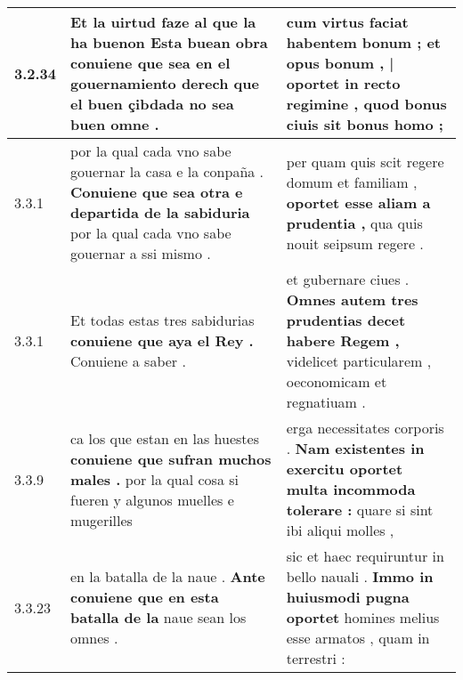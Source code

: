 \begin{tabular}{|p{1cm}|p{6.5cm}|p{6.5cm}|}
3.2.34 & Et la uirtud faze al que la ha buenon \textbf{ Esta buean obra conuiene que sea en el gouernamiento derech } que el buen çibdada no sea buen omne . & cum virtus faciat habentem bonum ; \textbf{ et opus bonum , | oportet in recto regimine , } quod bonus ciuis sit bonus homo ; \\\hline
3.3.1 & por la qual cada vno sabe gouernar la casa e la conpaña . \textbf{ Conuiene que sea otra e departida de la sabiduria } por la qual cada vno sabe gouernar a ssi mismo . & per quam quis scit regere domum et familiam , \textbf{ oportet esse aliam a prudentia , } qua quis nouit seipsum regere . \\\hline
3.3.1 & Et todas estas tres sabidurias \textbf{ conuiene que aya el Rey . } Conuiene a saber . & et gubernare ciues . \textbf{ Omnes autem tres prudentias decet habere Regem , } videlicet particularem , oeconomicam et regnatiuam . \\\hline
3.3.9 & ca los que estan en las huestes \textbf{ conuiene que sufran muchos males . } por la qual cosa si fueren y algunos muelles e mugerilles & erga necessitates corporis . \textbf{ Nam existentes in exercitu oportet multa incommoda tolerare : } quare si sint ibi aliqui molles , \\\hline
3.3.23 & en la batalla de la naue . \textbf{ Ante conuiene que en esta batalla de la } naue sean los omnes . & sic et haec requiruntur in bello nauali . \textbf{ Immo in huiusmodi pugna oportet } homines melius esse armatos , quam in terrestri : \\\hline

\end{tabular}
